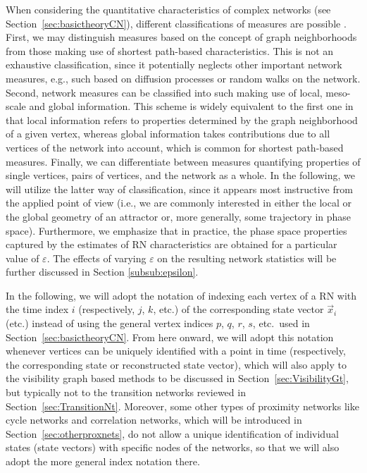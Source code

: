 		When considering the quantitative characteristics of complex networks (see Section~\ref{sec:basictheoryCN}), different classifications of measures are possible \cite{Donner2010a,Donges2012}. First, we may distinguish measures based on the concept of graph neighborhoods from those making use of shortest path-based characteristics. This is not an exhaustive classification, since it potentially neglects other important network measures, e.g., such based on diffusion processes or random walks on the network. Second, network measures can be classified into such making use of local, meso-scale and global information. This scheme is widely equivalent to the first one in that local information refers to properties determined by the graph neighborhood of a given vertex, whereas global information takes contributions due to all vertices of the network into account, which is common for shortest path-based measures. Finally, we can differentiate between measures quantifying properties of single vertices, pairs of vertices, and the network as a whole. In the following, we will utilize the latter way of classification, since it appears most instructive from the applied point of view (i.e., we are commonly interested in either the local or the global geometry of an attractor or, more generally, some trajectory in phase space). Furthermore, we emphasize that in practice, the phase space properties captured by the estimates of RN characteristics are obtained for a particular value of $\varepsilon$. The effects of varying $\varepsilon$ on the resulting network statistics will be further discussed in Section \ref{subsub:epsilon}.

        In the following, we will adopt the notation of indexing each vertex of a RN with the time index $i$ (respectively, $j$, $k$, etc.) of the corresponding state vector $\vec{x}_i$ (etc.) instead of using the general vertex indices $p$, $q$, $r$, $s$, etc.\, used in Section~\ref{sec:basictheoryCN}. From here onward, we will adopt this notation whenever vertices can be uniquely identified with a point in time (respectively, the corresponding state or reconstructed state vector), which will also apply to the visibility graph based methods to be discussed in Section~\ref{sec:VisibilityGt}, but typically not to the transition networks reviewed in Section~\ref{sec:TransitionNt}. Moreover, some other types of proximity networks like cycle networks and correlation networks, which will be introduced in Section~\ref{sec:otherproxnets}, do not allow a unique identification of individual states (state vectors) with specific nodes of the networks, so that we will also adopt the more general index notation there.

